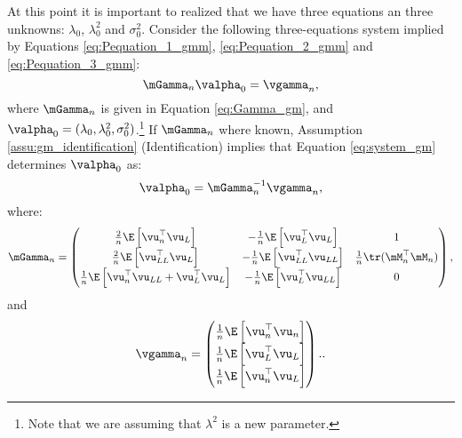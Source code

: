 At this point it is important to realized that we have three equations an three unknowns: $\lambda_0$, $\lambda^2_0$ and $\sigma^2_0$. Consider the following three-equations system implied by Equations \eqref{eq:Pequation_1_gmm}, \eqref{eq:Pequation_2_gmm} and \eqref{eq:Pequation_3_gmm}:
\begin{equation}\label{eq:system_gm}
  \mGamma_n\valpha_0  = \vgamma_n,
\end{equation}
%
where $\mGamma_n$ is given in Equation \eqref{eq:Gamma_gm}, and $\valpha_0 = (\lambda_0, \lambda^2_0, \sigma^2_0)$.\footnote{Note that we are assuming that $\lambda^2$ is a new parameter.} If $\mGamma_n$ where known, Assumption \ref{assu:gm_identification} (Identification) implies that Equation \eqref{eq:system_gm} determines $\valpha_0$ as:
\begin{equation*}
\valpha_0 = \mGamma_n^{-1}\vgamma_n,
\end{equation*}
%
where:
\begin{equation}\label{eq:Gamma_gm}
  \mGamma_n = \begin{pmatrix}
   \frac{2}{n}\E\left[\vu^\top_n\vu_L\right] & -\frac{1}{n}\E\left[\vu_L^\top\vu_L\right] & 1 \\
   \frac{2}{n}\E\left[\vu^\top_{LL}\vu_L\right] & -\frac{1}{n}\E\left[\vu_{LL}^\top\vu_{LL}\right] & \frac{1}{n} \tr(\mM^\top_n\mM_n)\\
   \frac{1}{n}\E\left[\vu^\top_n\vu_{LL} + \vu_L^\top\vu_L\right] & -\frac{1}{n}\E\left[\vu_{L}^\top\vu_{LL}\right] & 0
        \end{pmatrix},
\end{equation}
%
and
\begin{equation}
  \vgamma_n = \begin{pmatrix}
  \frac{1}{n}\E\left[\vu^\top_n\vu_n\right] \\
  \frac{1}{n}\E\left[\vu^\top_L\vu_L\right] \\
  \frac{1}{n}\E\left[\vu^\top_n\vu_L\right]
        \end{pmatrix}..
\end{equation}

